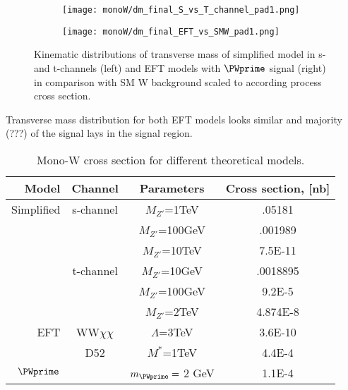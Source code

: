 \begin{figure}[hb]
\begin{subfigure}{.5\textwidth}
  \centering
  \texttt{[image: monoW/dm\_final\_S\_vs\_T\_channel\_pad1.png]} 
\end{subfigure}%
\begin{subfigure}{.5\textwidth}
  \centering
  \texttt{[image: monoW/dm\_final\_EFT\_vs\_SMW\_pad1.png]}
\end{subfigure}
\caption{Kinematic distributions of transverse mass of simplified model in s- and t-channels (left) 
and EFT models with $\PWprime$ signal (right) in comparison with SM W background scaled to according process cross section.}
  \label{fig:scaledKin}
\end{figure}

Transverse mass distribution for both EFT models looks similar and majority (???) of the signal lays in the signal region. 


\begin{table}[tp]
  \begin{tabular}{r|c|c|c}
    Model 	& Channel 	  & Parameters	    & Cross section, [nb] \\
    \midrule
    Simplified  & s-channel	  & $M_{Z'}$=1TeV    & .05181 \\
		&		  & $M_{Z'}$=100GeV  & .001989 \\
		&		  & $M_{Z'}$=10TeV   & 7.5E-11 \\
		& t-channel	  & $M_{Z'}$=10GeV   & .0018895 \\
		&		  & $M_{Z'}$=100GeV  & 9.2E-5 \\
		&		  & $M_{Z'}$=2TeV    & 4.874E-8 \\
    \midrule
EFT 	& WW$\chi\chi$	  & $\Lambda$=3TeV    & 3.6E-10 \\
	& D52		  & $M^{*}$=1TeV	& 4.4E-4 \\
    \midrule	
$\PWprime$ 	& 	  & $m_{\PWprime} =$ 2 GeV   & 1.1E-4 \\    
  \end{tabular}
  \caption{Mono-W cross section for different theoretical models.}
  \label{tab:TriggerDetails}
\end{table}


